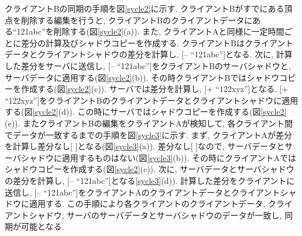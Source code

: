 クライアントBの同期の手順を図\ref{sycle2}に示す.
クライアントBがすでにある頂点を削除する編集を行うと, クライアントBのクライアントデータにある``121abc''を削除する(図\ref{sycle2}(a)).
また, クライアントAと同様に一定時間ごとに差分の計算及びシャドウコピーを作成する. クライアントBはクライアントデータとクライアントシャドウの差分を計算し, [-- ``121abc'']となる. 次に, 計算した差分をサーバに送信し, [-- ``121abc'']をクライアントBのサーバシャドウと, サーバデータに適用する(図\ref{sycle2}(b)). その時クライアントBではシャドウコピーを作成する(図\ref{sycle2}(c)). サーバでは差分を計算し, [+ ``122xyz'']となる. [+ ``122xyz'']をクライアントBのクライアントデータとクライアントシャドウに適用する(図\ref{sycle2}(d)). この時にサーバではシャドウコピーを作成する(図\ref{sycle2}(e)).
またクライアントBの編集をクライアントAが検知して, 各クライアント間でデータが一致するまでの手順を図\ref{sycle3}に示す.
まず, クライアントAが差分を計算し差分なし[ ]となる(図\ref{sycle3}(a)).
差分なし[ ]なので, サーバデータとサーバシャドウに適用するものはない(図\ref{sycle3}(b)). その時にクライアントAではシャドウコピーを作成する(図\ref{sycle2}(c)).
次に, サーバデータとサーバシャドウの差分を計算し, [-- ``121abc'']となる\ref{sycle3}(d)). 計算した差分をクライアントに送信し, [-- ``121abc'']をクライアントAのクライアントデータとクライアントシャドウに適用する.
この手順により各クライアントのクライアントデータ, クライアントシャドウ, サーバのサーバデータとサーバシャドウのデータが一致し, 同期が可能となる.

